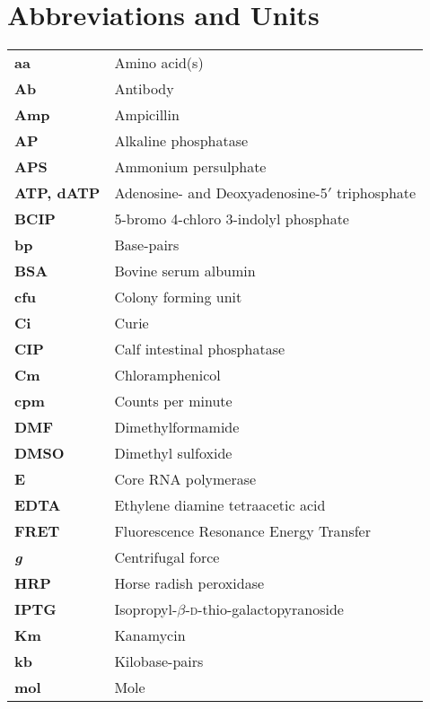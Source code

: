 \chapter{Abbreviations and Units}
\begin{center}
\begin{longtable}{l@{\ -\ \ }l}
\hline\addlinespace
\textbf{aa} & Amino acid(s) \\
\textbf{Ab} & Antibody \\
\textbf{Amp} & Ampicillin \\
\textbf{AP} & Alkaline phosphatase \\
\textbf{APS} & Ammonium persulphate \\
\textbf{ATP, dATP} & Adenosine- and Deoxyadenosine-5$'$ triphosphate \\
\addlinespace
\textbf{BCIP} & 5-bromo 4-chloro 3-indolyl phosphate\\
\textbf{bp} & Base-pairs \\
\textbf{BSA} & Bovine serum albumin\\
\addlinespace
\textbf{cfu} & Colony forming unit \\
\textbf{Ci} & Curie \\
\textbf{CIP} & Calf intestinal phosphatase\\
\textbf{Cm} & Chloramphenicol \\
\textbf{cpm} & Counts per minute \\
\addlinespace
\textbf{DMF} & Dimethylformamide \\
\textbf{DMSO} & Dimethyl sulfoxide \\
\addlinespace
\textbf{E} & Core RNA polymerase  \\
\textbf{EDTA} & Ethylene diamine tetraacetic acid \\
\addlinespace
\textbf{FRET} & Fluorescence Resonance Energy
Transfer\\
\addlinespace
\textbf{\textit{g}} & Centrifugal force \\
\addlinespace
\textbf{HRP} & Horse radish peroxidase \\
\addlinespace
\textbf{IPTG} & Isopropyl-$\beta$-\textsc{d}-thio-galactopyranoside \\
\addlinespace
\textbf{Km} & Kanamycin \\
\textbf{kb} & Kilobase-pairs \\
\addlinespace
\textbf{mol} & Mole \\

\end{longtable}
\end{center}
